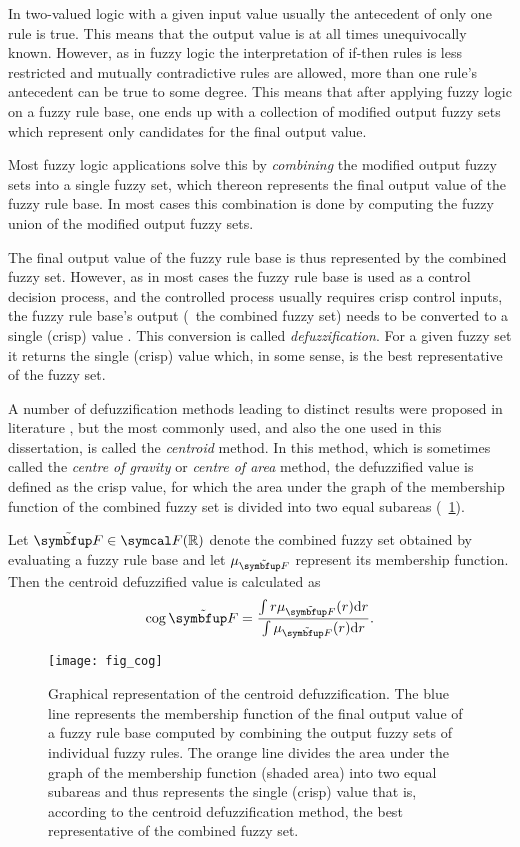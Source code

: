 In two-valued logic with a given input value usually the antecedent of only one rule is true. This means that the output value is at all times unequivocally known. However, as in fuzzy logic the interpretation of if-then rules is less restricted and mutually contradictive rules are allowed, more than one rule's antecedent can be true to some degree. This means that after applying fuzzy logic on a fuzzy rule base, one ends up with a collection of modified output fuzzy sets which represent only candidates for the final output value. 

Most fuzzy logic applications solve this by \emph{combining} the modified output fuzzy sets into a single fuzzy set, which thereon represents the final output value of the fuzzy rule base. In most cases this combination is done by computing the fuzzy union of the modified output fuzzy sets. 

The final output value of the fuzzy rule base is thus represented by the combined fuzzy set. However, as in most cases the fuzzy rule base is used as a control decision process, and the controlled process usually requires crisp control inputs, the fuzzy rule base's output (\ie\ the combined fuzzy set) needs to be converted to a single (crisp) value \cite{klir:1995,mendel:2001}. This conversion is called \emph{defuzzification}. For a given fuzzy set it returns the single (crisp) value which, in some sense, is the best representative of the fuzzy set.

A number of defuzzification methods leading to distinct results were proposed in literature \cite{dubois:1980,klir:1995,mendel:2001,pedrycz:1993,zimmermann:2001}, but the most commonly used, and also the one used in this dissertation, is called the \emph{centroid} method. In this method, which is sometimes called the \emph{centre of gravity} or \emph{centre of area} method, the defuzzified value is defined as the crisp value, for which the area under the graph of the membership function of the combined fuzzy set is divided into two equal subareas (\fig~\ref{fig:cog}). 

Let $\fset{F} \in \fpowset{\R}$ denote the combined fuzzy set obtained by evaluating a fuzzy rule base and let $\mu_\fset{F}$ represent its membership function. Then the centroid defuzzified value is calculated as
\begin{equation}
	\cog\fset{F}=\frac{\int r \mu_\fset{F}(r)\mathrm{d}r}{\int\mu_\fset{F}(r)\mathrm{d}r}.
\end{equation}

\begin{figure}
	\vspace*{5mm}
	\texttt{[image: fig\_cog]}
	\vspace*{5mm}
	\caption{Graphical representation of the centroid defuzzification. The blue line represents the membership function of the final output value of a fuzzy rule base computed by combining the output fuzzy sets of individual fuzzy rules. The orange line divides the area under the graph of the membership function (shaded area) into two equal subareas and thus represents the single (crisp) value that is, according to the centroid defuzzification method, the best representative of the combined fuzzy set.}
	\label{fig:cog}
\end{figure}
